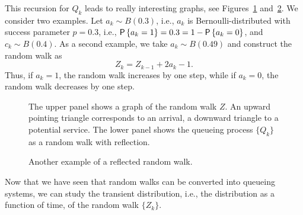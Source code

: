 This recursion for $Q_k$ leads to really
interesting graphs, see Figures~\ref{fig:random_bernoulli}
and~\ref{fig:random_walk}. We consider two examples. Let
$a_k \sim B(0.3)$, i.e., $a_k$ is Bernoulli-distributed with success
parameter $p=0.3$, i.e., $\P{a_k = 1} = 0.3 = 1- \P{a_k=0}$, and
$c_k \sim B(0.4)$. As a second example, we take $a_k\sim B(0.49)$ and
construct the random walk as
\begin{equation*}
  Z_k = Z_{k-1} + 2 a_k -1.
\end{equation*}
Thus, if $a_k=1$, the random walk increases by one step, while if
$a_k=0$, the random walk decreases by one step. 


\begin{figure}[ht]
  \centering

%
\caption{The upper panel shows a graph of the random walk $Z$. An
  upward pointing triangle corresponds to an arrival, a downward
  triangle to a potential service. The lower panel shows the queueing
  process $\{Q_k\}$ as a random walk with reflection.}
\label{fig:random_bernoulli}
\end{figure}

\begin{figure}[ht]
  \centering

\caption{Another example of a reflected random walk.}
\label{fig:random_walk}
\end{figure}


Now that we have seen that random walks can be converted into queueing
systems, we can study the transient distribution,
i.e., the distribution as a function of time, of the random walk
$\{Z_k\}$. 

